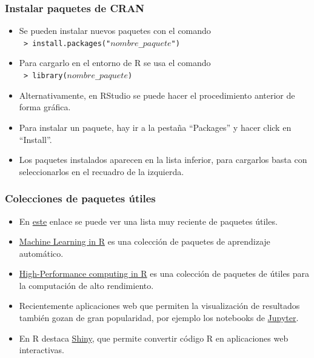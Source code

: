 \documentclass{beamer}
\begin{document}
\begin{frame}[fragile]
\frametitle{Instalar paquetes de CRAN}
\begin{itemize}
\item Se pueden instalar nuevos paquetes con el comando \\
\texttt{   > install.packages("$nombre$\_$paquete$")}
\item Para cargarlo en el entorno de R se usa el comando \\
\texttt{   > library($nombre$\_$paquete$)}
\item Alternativamente, en RStudio se puede hacer el procedimiento anterior de forma gráfica.
\item Para instalar un paquete, hay ir a la pestaña ``Packages'' y hacer click en ``Install''.
\item Los paquetes instalados aparecen en la lista inferior, para cargarlos basta con seleccionarlos en el recuadro de la izquierda.
\end{itemize}
\end{frame}

\begin{frame}
\frametitle{Colecciones de paquetes útiles}
\begin{itemize}
\item En \href{https://support.rstudio.com/hc/en-us/articles/201057987-Quick-list-of-useful-R-packages}{este} enlace se puede ver una lista muy reciente de paquetes útiles.
\item \href{https://cran.r-project.org/web/views/MachineLearning.html}{Machine Learning in R} es una colección de paquetes de aprendizaje automático.
\item \href{http://cran.r-project.org/web/views/HighPerformanceComputing.html}{High-Performance computing in R} es una colección de paquetes de útiles para la computación de alto rendimiento.
\item Recientemente aplicaciones web que permiten la visualización de resultados también gozan de gran popularidad, por ejemplo los notebooks de \href{http://jupyter.org/}{Jupyter}.
\item En R destaca \href{http://shiny.rstudio.com/}{Shiny}, que permite convertir código R en aplicaciones web interactivas.
\end{itemize}
\end{frame}
\end{document}
